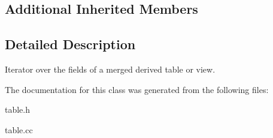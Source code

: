 \subsection*{Additional Inherited Members}


\subsection{Detailed Description}
Iterator over the fields of a merged derived table or view. 

The documentation for this class was generated from the following files\+:\begin{DoxyCompactItemize}
\item 
table.\+h\item 
table.\+cc\end{DoxyCompactItemize}
